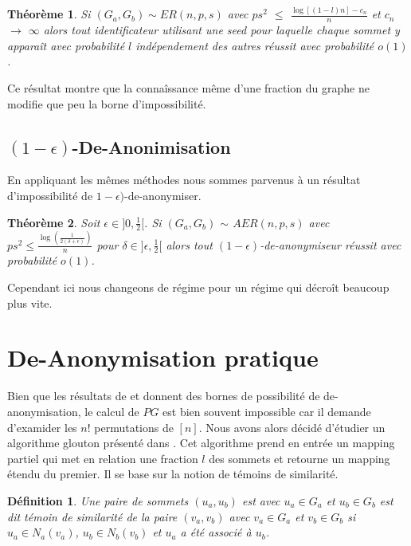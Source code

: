 \documentclass[letterpaper,10pt]{llncs}
\newtheorem{theoreme}{Théorème}
\newtheorem{defi}{Définition}
\begin{document}
\begin{theoreme}
Si $(G_a,G_b) \sim ER(n,p,s)$ avec $ps^{2}$ $\leq$ $\frac{\log[(1-l) n] - c_n}{n}$ et $c_n$ $\rightarrow$ $\infty$ alors tout identificateur utilisant une seed pour laquelle chaque sommet y apparaît avec probabilité $l$ indépendement des autres réussit avec probabilité $o(1)$. 
\end{theoreme}

Ce résultat montre que la connaîssance même d'une fraction du graphe ne modifie que peu la borne d'impossibilité.

\subsection{$(1-\epsilon)$-De-Anonimisation}

En appliquant les mêmes méthodes nous sommes parvenus à un résultat d'impossibilité de $1-\epsilon)$-de-anonymiser. 

\begin{theoreme}
Soit $\epsilon \in ]0,\frac{1}{2}[$. Si $(G_a,G_b)$ $\sim$ $AER(n,p,s)$ avec $ps^2 \leq \frac{\log(\frac{1}{2 (\delta + \epsilon)})}{n}$ pour $\delta \in ]\epsilon, \frac{1}{2}[$ alors tout $(1-\epsilon)$-de-anonymiseur réussit avec probabilité $o(1)$.
\end{theoreme}

Cependant ici nous changeons de régime pour un régime qui décroît beaucoup plus vite.

\section{De-Anonymisation pratique}

Bien que les résultats de \cite{Pedarsani:2011:PAN:2020408.2020596} et \cite{Cullina:2016:IAC:2964791.2901460} donnent des bornes de possibilité de de-anonymisation, le calcul de $PG$ est bien souvent impossible car il demande d'examider les $n!$ permutations de $[n]$. Nous avons alors décidé d'étudier un algorithme glouton présenté dans \cite{Korula:2014:ERA:2732269.2732274}. Cet algorithme prend en entrée un mapping partiel qui met en relation une fraction $l$ des sommets et retourne un mapping étendu du premier. Il se base sur la notion de témoins de similarité.

\begin{defi}
Une paire de sommets $(u_a,u_b)$ est avec $u_a \in G_a$ et $u_b \in G_b$ est dit témoin de similarité de la paire $(v_a,v_b)$ avec $v_a \in G_a$ et $v_b \in G_b$ si $u_a \in N_a(v_a)$, $u_b \in N_b(v_b)$ et $u_a$ a été associé à $u_b$.
\end{defi}
\end{document}
